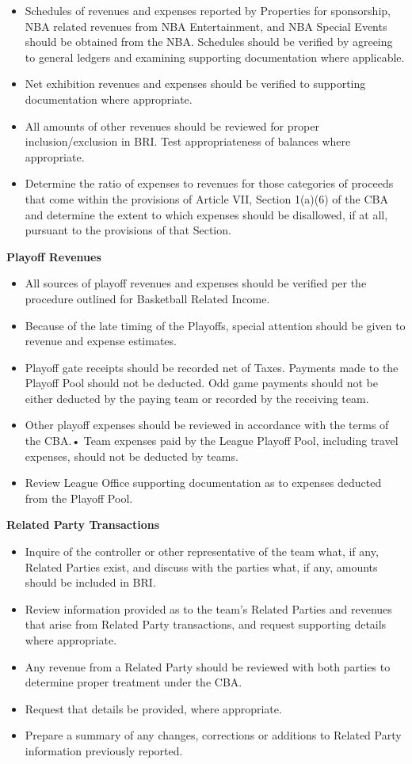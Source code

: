\documentclass[
]{book}
\providecommand{\tightlist}{%
  \setlength{\itemsep}{0pt}\setlength{\parskip}{0pt}}
\begin{document}
\begin{itemize}
\item
  Schedules of revenues and expenses reported by Properties for sponsorship, NBA related revenues from NBA Entertainment, and NBA Special Events should be obtained from the NBA. Schedules should be verified by agreeing to general ledgers and examining supporting documentation where applicable.
\item
  Net exhibition revenues and expenses should be verified to supporting documentation where appropriate.
\item
  All amounts of other revenues should be reviewed for proper inclusion/exclusion in BRI. Test appropriateness of balances where appropriate.
\item
  Determine the ratio of expenses to revenues for those categories of proceeds that come within the provisions of Article VII, Section 1(a)(6) of the CBA and determine the extent to which expenses should be disallowed, if at all, pursuant to the provisions of that Section.
\end{itemize}

\textbf{Playoff Revenues}

\begin{itemize}
\tightlist
\item
  All sources of playoff revenues and expenses should be verified per the procedure outlined for Basketball Related Income.
\item
  Because of the late timing of the Playoffs, special attention should be given to revenue and expense estimates.
\item
  Playoff gate receipts should be recorded net of Taxes. Payments made to the Playoff Pool should not be deducted. Odd game payments should not be either deducted by the paying team or recorded by the receiving team.
\item
  Other playoff expenses should be reviewed in accordance with the terms of the CBA.• Team expenses paid by the League Playoff Pool, including travel expenses, should not be deducted by teams.
\item
  Review League Office supporting documentation as to expenses deducted from the Playoff Pool.
\end{itemize}

\textbf{Related Party Transactions}

\begin{itemize}
\tightlist
\item
  Inquire of the controller or other representative of the team what, if any, Related Parties exist, and discuss with the parties what, if any, amounts should be included in BRI.
\item
  Review information provided as to the team's Related Parties and revenues that arise from Related Party transactions, and request supporting details where appropriate.
\item
  Any revenue from a Related Party should be reviewed with both parties to determine proper treatment under the CBA.
\item
  Request that details be provided, where appropriate.
\item
  Prepare a summary of any changes, corrections or additions to Related Party information previously reported.
\end{itemize}
\end{document}
